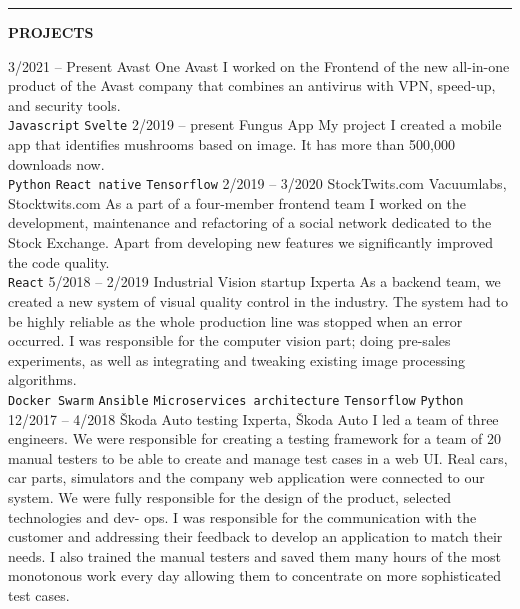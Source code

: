 \documentclass[10pt,A4]{article}
\newcommand{\cvsection}[2] {
\textcolor{sectcol}{\uppercase{\textbf{#1}}}
}
\newcommand{\cvsect}[4]{
	\textcolor{#3}{\hrule}
	\colorbox{#3}{ {\cvsection{#1}{#4}}}
}
\begin{document}
	\cvsect{Projects}{0.49}{thirdcol}{textcol}\\[20pt]
	\begin{entrylist}
		\entry
			{3/2021 -- Present}
			{Avast One}
			{Avast}
			{ I worked on the Frontend of the new all-in-one product of the Avast company that combines an antivirus with VPN, speed-up, and security tools.
				\\ 
				\texttt{Javascript}\slashsep
				\texttt{Svelte}
			}
		\entry
			{2/2019 -- present}
			{Fungus App}
			{My project}
			{I created a mobile app that identifies mushrooms based on
				image. It has more than 500,000 downloads now.
				\\ 
				\texttt{Python}\slashsep
				\texttt{React native}\slashsep
				\texttt{Tensorflow}}
		\entry
			{2/2019 -- 3/2020}
			{StockTwits.com}
			{Vacuumlabs, Stocktwits.com}
			{As a part of a four-member frontend team I worked on the development, maintenance
				and refactoring of a social network dedicated to the Stock Exchange. Apart from
				developing new features we significantly improved the code quality.  
				\\ 
				\texttt{React}}
		\entry
			{5/2018 -- 2/2019}
			{Industrial Vision startup}
			{Ixperta}
			{As a backend team, we created a new system of visual quality control in the
				industry. The system had to be highly reliable as the whole production line was stopped
				when an error occurred. I was responsible for the computer vision part; doing pre-sales
				experiments, as well as integrating and tweaking existing image processing algorithms.
				\\ 
				\texttt{Docker Swarm}\slashsep
				\texttt{Ansible}\slashsep
				\texttt{Microservices architecture}\slashsep
				\texttt{Tensorflow}\slashsep
				\texttt{Python}}
		\entry
			{12/2017 -- 4/2018}
			{Škoda Auto testing}
			{Ixperta, Škoda Auto}
			{I led a team of three engineers. We were responsible for creating a testing
				framework for a team of 20 manual testers to be able to create and manage test cases
				in a web UI. Real cars, car parts, simulators and the company web application were
				connected to our system.
				We were fully responsible for the design of the product, selected technologies and dev-
				ops. I was responsible for the communication with the customer and addressing their
				feedback to develop an application to match their needs. I also trained the manual
				testers and saved them many hours of the most monotonous work every day
				allowing them to concentrate on more sophisticated test cases. 
}
\end{entrylist}
\end{document}
